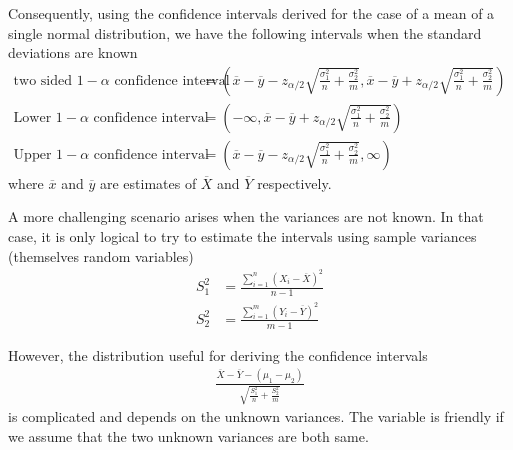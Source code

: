 \documentclass[../probability-notes.tex]{subfiles}
\begin{document}
    Consequently, using the confidence intervals derived for the case of a mean of a single normal distribution, we have the following intervals when the standard deviations are known
    \begin{align*}
        \text{two sided $1 - \alpha$ confidence interval} &= (\overline{x} - \overline{y}-z_{\alpha /2}\sqrt{\frac{\sigma_{1}^{2}}{n} + \frac{\sigma_{2}^{2}}{m}}, \overline{x} - \overline{y}+z_{\alpha /2}\sqrt{\frac{\sigma_{1}^{2}}{n} + \frac{\sigma_{2}^{2}}{m}})\\
        \text{Lower $1-\alpha$ confidence interval} &= (-\infty, \overline{x} - \overline{y}+z_{\alpha /2}\sqrt{\frac{\sigma_{1}^{2}}{n} + \frac{\sigma_{2}^{2}}{m}})\\
        \text{Upper $1-\alpha$ confidence interval} &= (\overline{x} - \overline{y}-z_{\alpha /2}\sqrt{\frac{\sigma_{1}^{2}}{n} + \frac{\sigma_{2}^{2}}{m}}, \infty)
    \end{align*}
    where $\overline{x}$ and $\overline{y}$ are estimates of $\overline{X}$ and $\overline{Y}$ respectively.

    A more challenging scenario arises when the variances are not known. In that case, it is only logical to try to estimate the intervals using sample variances (themselves random variables)
    \begin{align*}
        S_{1}^{2} &= \frac{\sum_{i=1}^{n} (X_{i} - \overline{X})^{2}}{n-1}\\
        S_{2}^{2} &= \frac{\sum_{i=1}^{m} (Y_{i} - \overline{Y})^{2}}{m-1}
    \end{align*}

    However, the distribution useful for deriving the confidence intervals
    \begin{align*}
        \frac{\overline{X} - \overline{Y} - (\mu_{1} - \mu_{2})}{\sqrt{\frac{S_{1}^{2}}{n} + \frac{S_{2}^{2}}{m}}}
    \end{align*}
    is complicated and depends on the unknown variances. The variable is friendly if we assume that the two unknown variances are both same.\newline
\end{document}
